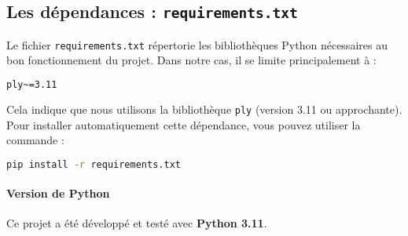 \documentclass[a4paper,12pt]{article}
\begin{document}
\subsection{Les dépendances : \texttt{requirements.txt}}
\label{subsec:requirements}

Le fichier \texttt{requirements.txt} répertorie les bibliothèques Python nécessaires au bon fonctionnement du projet. Dans notre cas, il se limite principalement à :

\begin{lstlisting}[language=bash, caption={requirements.txt}, label={lst:requirements}]
ply~=3.11
\end{lstlisting}

Cela indique que nous utilisons la bibliothèque \texttt{ply} (version 3.11 ou approchante). Pour installer automatiquement cette dépendance, vous pouvez utiliser la commande :
\begin{lstlisting}[language=bash, caption={Installation des dépendances}, label={lst:install}]
pip install -r requirements.txt
\end{lstlisting}

\paragraph{Version de Python}
Ce projet a été développé et testé avec \textbf{Python 3.11}.
\end{document}
